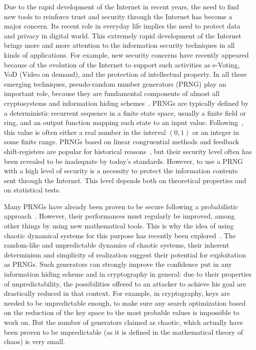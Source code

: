\documentclass[journal]{IEEEtran}
\begin{document}
Due to the rapid development of the Internet in recent years, the need to find new tools to reinforce trust and security through the Internet has become a major concern. 
Its recent role in everyday life implies the need to protect data and privacy in digital world. This extremely rapid development of the Internet brings more and more attention to the information security techniques in all kinds of applications. For example, new security concerns have recently appeared because of the evolution of the Internet to support such activities as e-Voting, VoD (Video on demand), and the protection of intellectual property. 
In all these emerging techniques, pseudo-random number generators (PRNG) play an important role, because they are fundamental components of almost all cryptosystems and information hiding schemes~\cite{Tong2009480,Erclebi2005}.
PRNGs are typically defined by a deterministic recurrent sequence in a finite state space, usually a finite field or ring, and an output function mapping each state to an input value. Following~\cite{L'ecuyer2008}, this value is often either a real number in the interval $(0,1)$ or an integer in some finite range. PRNGs based on linear congruential methods and feedback shift-registers are popular for historical reasons~\cite{Knuth1998}, but their security level often has been revealed to be inadequate by today's standards.
However, to use a PRNG with a high level of security is a necessity to protect the information contents sent through the Internet.
This level depends both on theoretical properties and on statistical tests.

Many PRNGs have already been proven to be secure following a probabilistic approach~\cite{Marchi20093328,Sachez2005,Tan2002693}. However, their performances must regularly be improved, among other things by using new mathematical tools.
This is why the idea of using chaotic dynamical systems for this purpose has recently been explored~\cite{Falcioni2005,Cecen2009}.
The random-like and unpredictable dynamics of chaotic systems, their inherent determinism and simplicity of realization suggest their potential for exploitation as PRNGs.
Such generators can strongly improve the confidence put in any information hiding scheme and in cryptography in general: due to their properties of unpredictability, the possibilities offered to an attacker to achieve his goal are drastically reduced in that context.
For example, in cryptography, keys are needed to be unpredictable enough, to make sure any search optimization based on the reduction of the key space to the most probable values is impossible to work on.
But the number of generators claimed as chaotic, which actually have been proven to be unpredictable (as it is defined in the mathematical theory of chaos) is very small.
\end{document}
